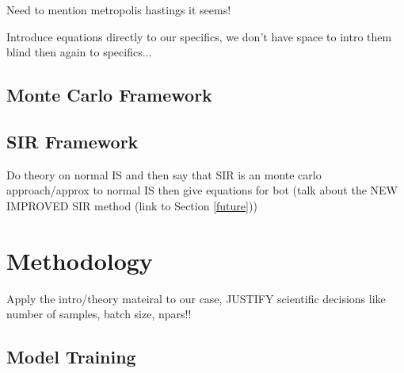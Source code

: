 \documentclass[aps,superscriptaddress,twocolumn,nopreprintnumbers,floatfix,groupedaddress]{revtex4-1}
\begin{document}
%
%
%


Need to mention metropolis hastings it seems!

Introduce equations directly to our specifics, we don't have space to intro them blind then again to specifics...

\subsection{Monte Carlo Framework}\label{theory:monte}

\subsection{SIR Framework}\label{theory:sir}

Do theory on normal IS and then say that SIR is an monte carlo approach/approx to normal IS then give equations for bot (talk about the NEW IMPROVED SIR method (link to Section \ref{future}))

%

\section{Methodology}\label{methods}

Apply the intro/theory mateiral to our case, JUSTIFY scientific decisions like number of samples, batch size, npars!!

\subsection{Model Training}
\end{document}
